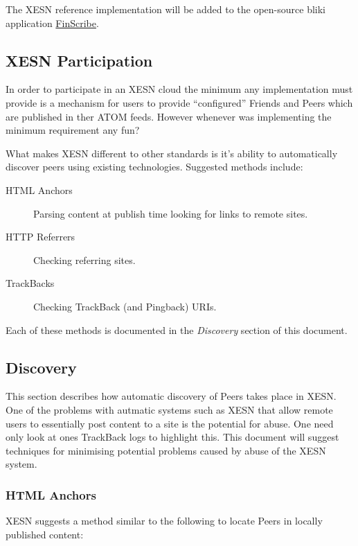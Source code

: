 \documentclass[titlepage,english,a4paper,twoside,dvips]{article}
\begin{document}
The XESN reference implementation will be added to the open-source bliki application \href{http://hww3.riverweb.com/space/pike/FinScribe}{FinScribe}.

\subsection{XESN Participation}

In order to participate in an XESN cloud the minimum any implementation must provide is a mechanism for users to provide ``configured'' Friends and Peers which are published in ther ATOM feeds.  However whenever was implementing the minimum requirement any fun?

What makes XESN different to other standards is it's ability to automatically discover peers using existing technologies.  Suggested methods include:

\begin{description}

\item[HTML Anchors] Parsing content at publish time looking for links to remote sites.

\item[HTTP Referrers] Checking referring sites.

\item[TrackBacks] Checking TrackBack (and Pingback) URIs.

\end{description}

Each of these methods is documented in the \emph{Discovery} section of this document. 

\subsection{Discovery}

This section describes how automatic discovery of Peers takes place in XESN.  One of the problems with autmatic systems such as XESN that allow remote users to essentially post content to a site is the potential for abuse.  One need only look at ones TrackBack logs to highlight this.  This document will suggest techniques for minimising potential problems caused by abuse of the XESN system.

\subsubsection{HTML Anchors}

XESN suggests a method similar to the following to locate Peers in locally published content:
\end{document}
